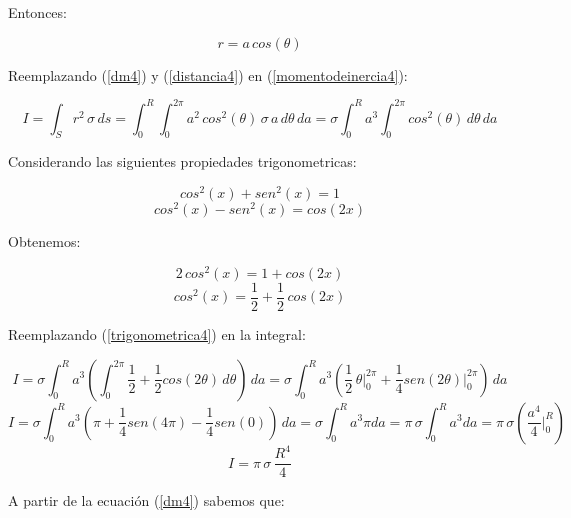 \documentclass[letter,11pt]{article}
\begin{document}
Entonces:

\begin{equation}
    r = a\, cos (\theta)
\label{distancia4}
\end{equation}

Reemplazando (\ref{dm4}) y (\ref{distancia4}) en (\ref{momentodeinercia4}): 

\begin{equation*}
    I = \int_{S} r^2\, \sigma\, ds = \int_{0}^{R} \int_{0}^{2\pi} a^2\, cos^2(\theta)\, \sigma\, a\, d\theta\, da = \sigma \int_{0}^{R} a^3 \int_{0}^{2\pi} cos^2(\theta)\, d\theta\, da
\end{equation*}

Considerando las siguientes propiedades trigonometricas:

\begin{equation*}
    cos^2(x) + sen^2(x) = 1
\end{equation*}
\begin{equation*}
    cos^2(x) - sen^2(x) = cos(2x)
\end{equation*}

Obtenemos:

\begin{equation*}
    2\, cos^2(x) = 1 + cos(2x)
\end{equation*}
\begin{equation}
    cos^2(x) = \frac{1}{2} + \frac{1}{2}\, cos(2x)
\label{trigonometrica4}
\end{equation}

Reemplazando (\ref{trigonometrica4}) en la integral:

\begin{equation*}
    I = \sigma \int_{0}^{R} a^3 \left( \int_{0}^{2\pi} \frac{1}{2} + \frac{1}{2} cos(2\theta) \, d\theta \right) \, da = \sigma \int_{0}^{R} a^3 \left( \frac{1}{2}\, \theta \Biggr|_{0}^{2\pi} + \frac{1}{4} sen(2\theta) \Biggr|_{0}^{2\pi} \right) \, da 
\end{equation*}
\begin{equation*}
    I = \sigma \int_{0}^{R} a^3 \left( \pi + \frac{1}{4} sen(4\pi) - \frac{1}{4} sen(0) \right) \, da = \sigma \int_{0}^{R} a^3 \pi da = \pi\, \sigma \int_{0}^{R} a^3 da = \pi\, \sigma \left( \frac{a^4}{4} \Biggr|_{0}^{R} \right)
\end{equation*}
\begin{equation}
    I = \pi\, \sigma\, \frac{R^4}{4}
\label{resultado4}
\end{equation}

A partir de la ecuación (\ref{dm4}) sabemos que:
\end{document}
